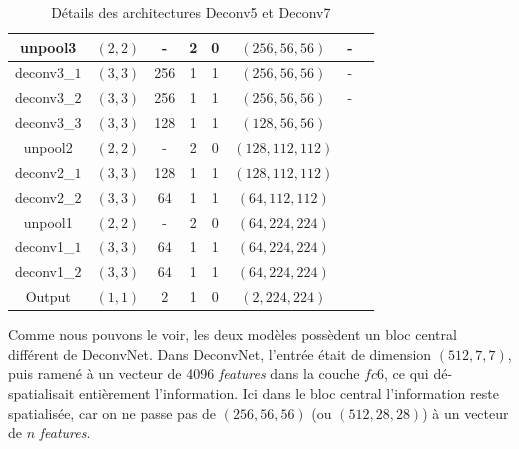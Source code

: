 \documentclass[a4paper, 11pt]{report}
\begin{document}
\begin{table}[H]
\begin{tabular}{|c|c|c|c|c|c|c|c|}
	\hline
	unpool3 & $(2, 2)$ & - & 2 & 0 & $(256, 56, 56)$ & - & \checkmark \\
	\hline
	deconv3\_$1$ & $(3, 3)$ & 256 & 1 & 1 & $(256, 56, 56)$ & - & \checkmark \\
	\hline
	deconv3\_$2$ & $(3, 3)$ & 256 & 1 & 1 & $(256, 56, 56)$ & - & \checkmark \\
	\hline
	deconv3\_$3$ & $(3, 3)$ & 128 & 1 & 1 & $(128, 56, 56)$ & \checkmark & \checkmark \\
	\hline
	unpool2 & $(2, 2)$ & - & 2 & 0 & $(128, 112, 112)$ & \checkmark & \checkmark \\
	\hline
	deconv2\_$1$ & $(3, 3)$ & 128 & 1 & 1 & $(128, 112, 112)$ & \checkmark & \checkmark \\
	\hline
	deconv2\_$2$ & $(3, 3)$ & 64 & 1 & 1 & $(64, 112, 112)$ & \checkmark & \checkmark \\
	\hline
	unpool1 & $(2, 2)$ & - & 2 & 0 & $(64, 224, 224)$ & \checkmark & \checkmark \\
	\hline
	deconv1\_$1$ & $(3, 3)$ & 64 & 1 & 1 & $(64, 224, 224)$ & \checkmark & \checkmark \\
	\hline
	deconv1\_$2$ & $(3, 3)$ & 64 & 1 & 1 & $(64, 224, 224)$ & \checkmark & \checkmark \\
	\hline
	Output & $(1, 1)$ & 2 & 1 & 0 & $(2, 224, 224)$ & \checkmark & \checkmark \\
	\hline
	\end{tabular} 
	\caption{Détails des architectures Deconv5 et Deconv7}
\end{table}

Comme nous pouvons le voir, les deux modèles possèdent un bloc central différent de DeconvNet.
Dans DeconvNet, l'entrée était de dimension $(512, 7, 7)$, puis ramené à un vecteur de 4096 \emph{features} dans la couche $fc6$, ce qui dé-spatialisait entièrement l'information.
Ici dans le bloc central l'information reste spatialisée, car on ne passe pas de $(256, 56, 56)$ (ou $(512, 28, 28)$) à un vecteur de $n$ \emph{features}.
\end{document}
